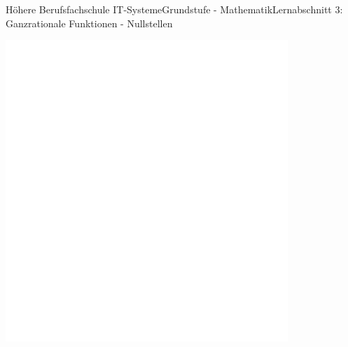 \documentclass[oneside,openany,headings=optiontotoc,11pt,numbers=noenddot]{scrreprt}
\begin{document}
\begin{worksheet}{Höhere Berufsfachschule IT-Systeme}{Grundstufe - Mathematik}{Lernabschnitt 3: Ganzrationale Funktionen - Nullstellen}
\begin{framed}
			\includegraphics[width=0.8\textwidth]{../../empty.jpg}\\
		\end{framed}
		\newpage
		

\end{worksheet}
\end{document}
